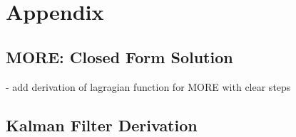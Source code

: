 
\chapter{Appendix}

\section{MORE: Closed Form Solution}
- add derivation of lagragian function for MORE with clear
steps


\section{Kalman Filter Derivation}
